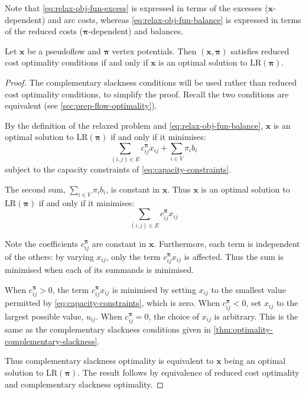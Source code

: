 Note that \cref{eq:relax-obj-fun-excess} is expressed in terms of the excesses ($\mathbf{x}$-dependent) and arc costs, whereas \cref{eq:relax-obj-fun-balance} is expressed in terms of the reduced costs ($\boldsymbol{\pi}$-dependent) and balances.\\

\begin{lemma} \label{lemma:relax-rc-lr-equivalence}
Let $\mathbf{x}$ be a pseudoflow and $\boldsymbol{\pi}$ vertex potentials. Then $\left(\mathbf{x},\boldsymbol{\pi}\right)$ satisfies reduced cost optimality conditions if and only if $\mathbf{x}$ is an optimal solution to $\mathrm{LR}(\boldsymbol{\pi})$.
\end{lemma}
\begin{proof}
The complementary slackness conditions will be used rather than reduced cost optimality conditions, to simplify the proof. Recall the two conditions are equivalent (see \cref{sec:prep-flow-optimality}).

By the definition of the relaxed problem and  \cref{eq:relax-obj-fun-balance}, $\mathbf{x}$ is an optimal solution to $\mathrm{LR}(\boldsymbol{\pi})$ if and only if it minimises:
\[\sum_{\left(i,j\right)\in E}c_{ij}^{\boldsymbol{\pi}}x_{ij}+\sum_{i\in V}\pi_{i}b_{i}\]
subject to the capacity constraints of \cref{eq:capacity-constraints}.

The second sum, $\sum_{i \in V} \pi_i b_i$, is constant in $\mathbf{x}$. Thus $\mathbf{x}$ is an optimal solution to $\mathrm{LR}(\boldsymbol{\pi})$ if and only if it minimises:
\[\sum_{\left(i,j\right)\in E}c_{ij}^{\boldsymbol{\pi}}x_{ij}\]

Note the coefficients $c_{ij}^{\boldsymbol{\pi}}$ are constant in $\mathbf{x}$. Furthermore, each term is independent of the others: by varying $x_{ij}$, only the term $c_{ij}^{\boldsymbol{\pi}}x_{ij}$ is affected\footnotemark. Thus the sum is minimised when each of its summands is minimised.

When $c_{ij}^{\boldsymbol{\pi}}>0$, the term $c_{ij}^{\boldsymbol{\pi}}x_{ij}$ is minimised by setting $x_{ij}$ to the smallest value permitted by \cref{eq:capacity-constraints}, which is zero. When $c_{ij}^{\boldsymbol{\pi}}<0$, set $x_{ij}$ to the largest possible value, $u_{ij}$. When $c_{ij}^{\boldsymbol{\pi}}=0$, the choice of $x_{ij}$ is arbitrary. This is the same as the complementary slackness conditions given in \cref{thm:optimality-complementary-slackness}. 

Thus complementary slackness optimality is equivalent to $\mathbf{x}$ being an optimal solution to $\mathrm{LR}(\boldsymbol{\pi})$. The result follows by equivalence of reduced cost optimality and complementary slackness optimality.
\end{proof}

